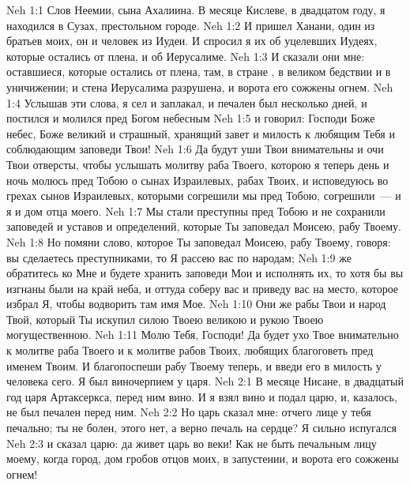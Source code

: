 \vs Neh 1:1 Слов Неемии, сына Ахалиина. В месяце Кислеве, в двадцатом году, я находился в Сузах, престольном городе.
\vs Neh 1:2 И пришел Ханани, один из братьев моих, он и  человек из Иудеи. И спросил я их об уцелевших Иудеях, которые остались от плена, и об Иерусалиме.
\vs Neh 1:3 И сказали они мне: оставшиеся, которые остались от плена,  там, в стране , в великом бедствии и в уничижении; и стена Иерусалима разрушена, и ворота его сожжены огнем.
\rsbpar\vs Neh 1:4 Услышав эти слова, я сел и заплакал, и печален был несколько дней, и постился и молился пред Богом небесным
\vs Neh 1:5 и говорил: Господи Боже небес, Боже великий и страшный, хранящий завет и милость к любящим Тебя и соблюдающим заповеди Твои!
\vs Neh 1:6 Да будут уши Твои внимательны и очи Твои отверсты, чтобы услышать молитву раба Твоего, которою я теперь день и ночь молюсь пред Тобою о сынах Израилевых, рабах Твоих, и исповедуюсь во грехах сынов Израилевых, которыми согрешили мы пред Тобою, согрешили~--- и я и дом отца моего.
\vs Neh 1:7 Мы стали преступны пред Тобою и не сохранили заповедей и уставов и определений, которые Ты заповедал Моисею, рабу Твоему.
\vs Neh 1:8 Но помяни слово, которое Ты заповедал Моисею, рабу Твоему, говоря:  вы сделаетесь преступниками, то Я рассею вас по народам;
\vs Neh 1:9  же обратитесь ко Мне и будете хранить заповеди Мои и исполнять их, то хотя бы вы изгнаны были на край неба, и оттуда соберу вас и приведу вас на место, которое избрал Я, чтобы водворить там имя Мое.
\vs Neh 1:10 Они же рабы Твои и народ Твой, который Ты искупил силою Твоею великою и рукою Твоею могущественною.
\vs Neh 1:11 Молю Тебя, Господи! Да будет ухо Твое внимательно к молитве раба Твоего и к молитве рабов Твоих, любящих благоговеть пред именем Твоим. И благопоспеши рабу Твоему теперь, и введи его в милость у человека сего. Я был виночерпием у царя.
\vs Neh 2:1 В месяце Нисане, в двадцатый год царя Артаксеркса,  перед ним вино. И я взял вино и подал царю, и, казалось, не был печален перед ним.
\vs Neh 2:2 Но царь сказал мне: отчего лице у тебя печально; ты не болен, этого нет, а верно печаль на сердце? Я сильно испугался
\vs Neh 2:3 и сказал царю: да живет царь во веки! Как не быть печальным лицу моему, когда город, дом гробов отцов моих, в запустении, и ворота его сожжены огнем!
